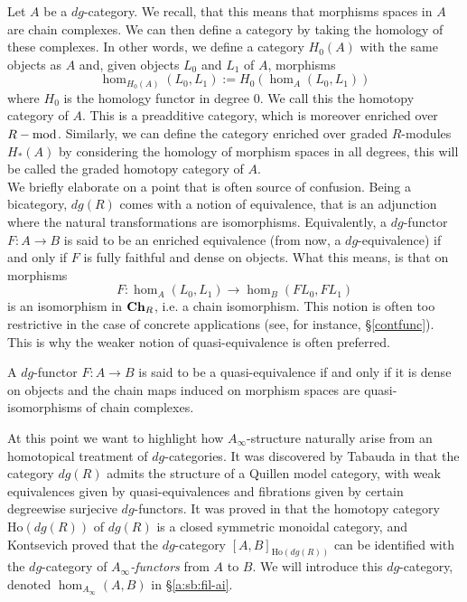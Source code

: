 Let $A$ be a $dg$-category. We recall, that this means that morphisms spaces in $A$ are chain complexes. We can then define a category by taking the homology of these complexes. In other words, we define a category $H_0(A)$ with the same objects as $A$ and, given objects $L_0$ and $L_1$ of $A$, morphisms $$\hom_{H_0(A)}(L_0,L_1):=H_0(\hom_{A}(L_0,L_1))$$ where $H_0$ is the homology functor in degree $0$. We call this the homotopy category of $A$. This is a preadditive category, which is moreover enriched over $R-\text{mod}$. Similarly, we can define the category enriched over graded $R$-modules $H_*(A)$ by considering the homology of morphism spaces in all degrees, this will be called the graded homotopy category of $A$.\\


We briefly elaborate on a point that is often source of confusion. Being a bicategory, $dg(R)$ comes with a notion of equivalence, that is an adjunction where the natural transformations are isomorphisms. Equivalently, a $dg$-functor $F\colon A\to B$ is said to be an enriched equivalence (from now, a $dg$-equivalence) if and only if $F$ is fully faithful and dense on objects. What this means, is that on morphisms $$F\colon \hom_A(L_0,L_1)\to \hom_B(FL_0,FL_1)$$ is an isomorphism in $\mathbf{Ch}_R$, i.e. a chain isomorphism. This notion is often too restrictive in the case of concrete applications (see, for instance, \S\ref{contfunc}). This is why the weaker notion of quasi-equivalence is often preferred.
\begin{dfn}
    A $dg$-functor $F\colon A\to B$ is said to be a quasi-equivalence if and only if it is dense on objects and the chain maps induced on morphism spaces are quasi-isomorphisms of chain complexes.
\end{dfn} 

\begin{remark}
    At this point we want to highlight how $A_\infty$-structure naturally arise from an homotopical treatment of $dg$-categories. It was discovered by Tabauda in \cite{TABUADA200515} that the category $dg(R)$ admits the structure of a Quillen model category, with weak equivalences given by quasi-equivalences and fibrations given by certain degreewise surjecive $dg$-functors. It was proved in \cite{Toen2007} that the homotopy category $\text{Ho}(dg(R))$ of $dg(R)$ is a closed symmetric monoidal category, and Kontsevich proved that the $dg$-category $[A,B]_{\text{Ho}(dg(R))}$ can be identified with the $dg$-category of \textit{$A_\infty$-functors} from $A$ to $B$. We will introduce this $dg$-category, denoted $\hom_{A_\infty}(A,B)$ in \S\ref{a:sb:fil-ai}.
\end{remark}

